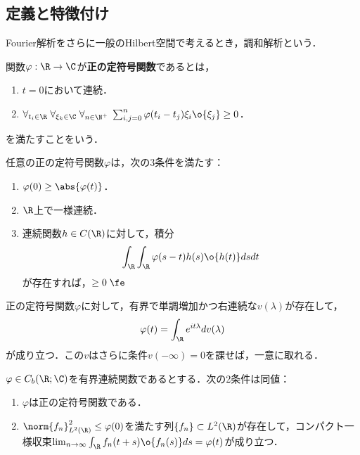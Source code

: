 \documentclass[uplatex,dvipdfmx]{jsreport}
\begin{document}
\subsection{定義と特徴付け}


\begin{tcolorbox}[colframe=ForestGreen, colback=ForestGreen!10!white,breakable,colbacktitle=ForestGreen!40!white,coltitle=black,fonttitle=\bfseries\sffamily,
    title=]
    Fourier解析をさらに一般のHilbert空間で考えるとき，調和解析という．\cite{吉田}
\end{tcolorbox}

\begin{definition}
    関数$\varphi:\R\to\C$が\textbf{正の定符号関数}であるとは，
    \begin{enumerate}
        \item $t=0$において連続．
        \item $\forall_{t_i\in\R}\;\forall_{\xi_k\in\C}\;\forall_{n\in\N^+}\;\sum_{i,j=0}^n\varphi(t_i-t_j)\xi_i\o{\xi_j}\ge0$．
    \end{enumerate}
    を満たすことをいう．
\end{definition}

\begin{lemma}
    任意の正の定符号関数$\varphi$は，次の3条件を満たす：
    \begin{enumerate}
        \item $\varphi(0)\ge\abs{\varphi(t)}$．
        \item $\R$上で一様連続．
        \item 連続関数$h\in C(\R)$に対して，積分
        \[\int_\R\int_\R\varphi(s-t)h(s)\o{h(t)}dsdt\]
        が存在すれば，$\ge0\;\fe$
    \end{enumerate}
\end{lemma}

\begin{theorem}
    正の定符号関数$\varphi$に対して，有界で単調増加かつ右連続な$v(\lambda)$が存在して，
    \[\varphi(t)=\int_\R e^{it\lambda}dv(\lambda)\]
    が成り立つ．この$v$はさらに条件$v(-\infty)=0$を課せば，一意に取れる．
\end{theorem}

\begin{theorem}[Khintchine]
    $\varphi\in C_b(\R;\C)$を有界連続関数であるとする．次の2条件は同値：
    \begin{enumerate}
        \item $\varphi$は正の定符号関数である．
        \item $\norm{f_n}_{L^2(\R)}^2\le\varphi(0)$を満たす列$\{f_n\}\subset L^2(\R)$が存在して，コンパクト一様収束$\lim_{n\to\infty}\int_\R f_n(t+s)\o{f_n(s)}ds=\varphi(t)$が成り立つ．
    \end{enumerate}
\end{theorem}
\end{document}
